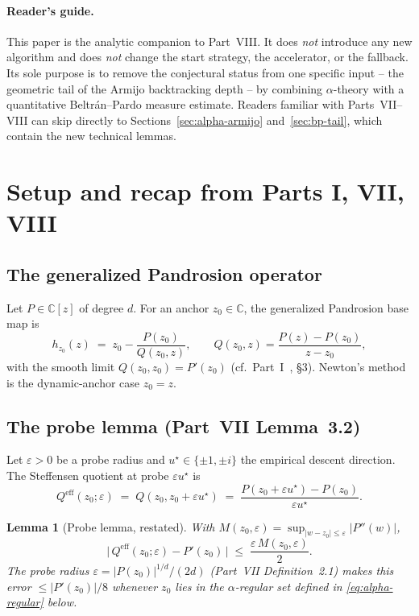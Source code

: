 \documentclass[11pt,a4paper]{article}
\newtheorem{lemma}[theorem]{Lemma}
\begin{document}
\paragraph{Reader's guide.}
This paper is the analytic companion to Part~VIII. It does \emph{not} introduce any new algorithm and does \emph{not} change the start strategy, the accelerator, or the fallback. Its sole purpose is to remove the conjectural status from one specific input -- the geometric tail of the Armijo backtracking depth -- by combining $\alpha$-theory with a quantitative Beltr\'an--Pardo measure estimate. Readers familiar with Parts~VII--VIII can skip directly to Sections~\ref{sec:alpha-armijo} and~\ref{sec:bp-tail}, which contain the new technical lemmas.

\tableofcontents

\section{Setup and recap from Parts I, VII, VIII}\label{sec:setup}

\subsection{The generalized Pandrosion operator}
Let $P \in \mathbb{C}[z]$ of degree $d$. For an anchor $z_0 \in \mathbb{C}$, the generalized Pandrosion base map is
\begin{equation}\label{eq:pandrosion-base}
h_{z_0}(z) \;=\; z_0 - \frac{P(z_0)}{Q(z_0, z)}, \qquad Q(z_0, z) = \frac{P(z) - P(z_0)}{z - z_0},
\end{equation}
with the smooth limit $Q(z_0, z_0) = P'(z_0)$ (cf.\ Part~I~\cite{besevic1}, \S3). Newton's method is the dynamic-anchor case $z_0 = z$.

\subsection{The probe lemma (Part~VII Lemma~3.2)}
Let $\varepsilon > 0$ be a probe radius and $u^{\star} \in \{\pm 1, \pm i\}$ the empirical descent direction. The Steffensen quotient at probe $\varepsilon u^{\star}$ is
\begin{equation}\label{eq:steffensen-Q}
Q^{\text{eff}}(z_0; \varepsilon) \;=\; Q(z_0, z_0 + \varepsilon u^{\star}) \;=\; \frac{P(z_0 + \varepsilon u^\star) - P(z_0)}{\varepsilon u^{\star}}.
\end{equation}

\begin{lemma}[Probe lemma, restated]\label{lem:probe-recap}
With $M(z_0, \varepsilon) = \sup_{|w - z_0| \le \varepsilon} |P''(w)|$,
\begin{equation}\label{eq:probe-bound}
\bigl|\,Q^{\text{eff}}(z_0; \varepsilon) - P'(z_0)\,\bigr| \;\le\; \frac{\varepsilon\, M(z_0, \varepsilon)}{2}.
\end{equation}
The probe radius $\varepsilon = |P(z_0)|^{1/d} / (2 d)$ (Part~VII Definition~2.1) makes this error $\le |P'(z_0)| / 8$ whenever $z_0$ lies in the $\alpha$-regular set defined in \eqref{eq:alpha-regular} below.
\end{lemma}
\end{document}

